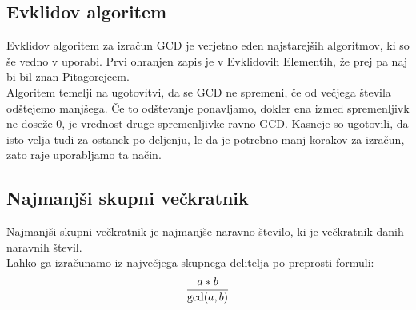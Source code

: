 \documentclass[10pt,a4paper,oneside]{book}
\begin{document}
\subsection{Evklidov algoritem}
Evklidov algoritem za izračun GCD je verjetno eden najstarejših algoritmov, ki so še vedno v uporabi. Prvi ohranjen zapis je v Evklidovih Elementih\cite{elementi}, že prej pa naj bi bil znan Pitagorejcem. \\

Algoritem temelji na ugotovitvi, da se GCD ne spremeni, če od večjega števila odštejemo manjšega. Če to odštevanje ponavljamo, dokler ena izmed spremenljivk ne doseže 0, je vrednost druge spremenljivke ravno GCD. Kasneje so ugotovili, da isto velja tudi za ostanek po deljenju, le da je potrebno manj korakov za izračun, zato raje uporabljamo ta način.


\subsection{Najmanjši skupni večkratnik}
Najmanjši skupni večkratnik je najmanjše naravno število, ki je večkratnik danih naravnih števil.\\
Lahko ga izračunamo iz največjega skupnega delitelja po preprosti formuli:
\[{a*b \over \operatorname{gcd}(a,b)}\]
%

\end{document}
